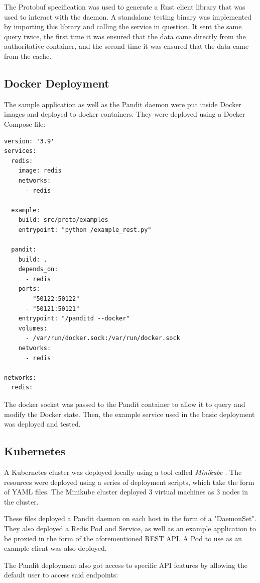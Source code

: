 \documentclass[a4paper,12pt]{report}
\begin{document}
The Protobuf specification was used to generate a Rust client library \cite{codegen} that was used to interact with the daemon.
A standalone testing binary was implemented by importing this library and calling the service in question.
It sent the same query twice, the first time it was ensured that the data came directly from the authoritative container, and the second time it was
ensured that the data came from the cache.

\subsection{Docker Deployment}
The sample application as well as the Pandit daemon were put inside Docker images and deployed to docker containers. 
They were deployed using a Docker Compose \cite{compose} file:
\begin{lstlisting}
version: '3.9'
services:
  redis:
    image: redis
    networks:
      - redis

  example:
    build: src/proto/examples
    entrypoint: "python /example_rest.py"

  pandit:
    build: .
    depends_on:
      - redis
    ports:
      - "50122:50122"
      - "50121:50121"
    entrypoint: "/panditd --docker"
    volumes:
      - /var/run/docker.sock:/var/run/docker.sock
    networks:
      - redis

networks:
  redis:
\end{lstlisting}

The docker socket was passed to the Pandit container to allow it to query and modify the Docker state.
Then, the example service used in the basic deployment was deployed and tested.

\subsection{Kubernetes}
A Kubernetes cluster was deployed locally using a tool called \textit{Minikube \cite{kube}}. 
The resources were deployed using a series of deployment scripts, which take the form of YAML files.
The Minikube cluster deployed 3 virtual machines as 3 nodes in the cluster.

These files deployed a Pandit daemon on each host in the form of a "DaemonSet".
They also deployed a Redis Pod and Service, as well as an example application to be proxied in the form of the aforementioned REST API.
A Pod to use as an example client was also deployed.

The Pandit deployment also got access to specific API features by allowing the default user to access said endpoints:
\end{document}
